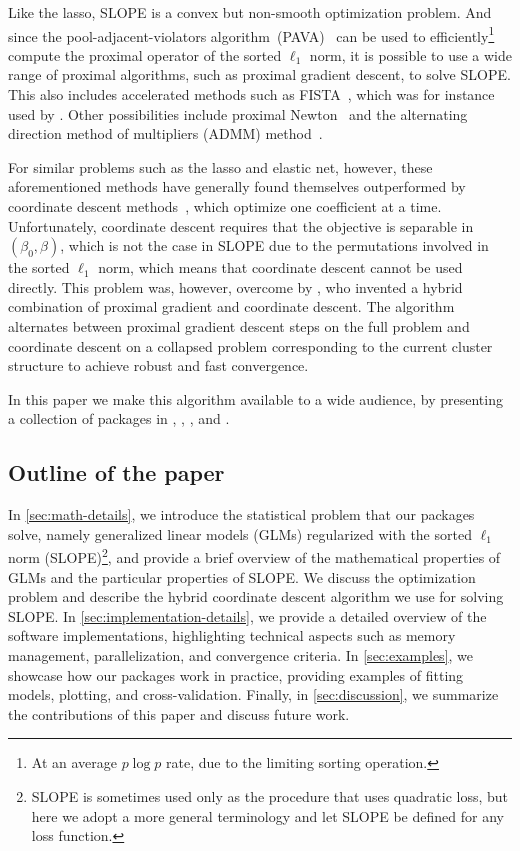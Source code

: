 \documentclass[article]{jss}
\begin{document}
Like the lasso, SLOPE is a convex but non-smooth optimization problem. And since the
pool-adjacent-violators algorithm~(PAVA)~\citep{barlow1972} can be used to
efficiently\footnote{At an average \(p \log p\) rate, due to the limiting
  sorting operation.} compute the proximal operator of the sorted \(\ell_1\)
norm, it is possible to use a wide range of proximal algorithms, such
as proximal gradient descent, to solve SLOPE. This also includes accelerated
methods such as FISTA~\citep{beck2009}, which was for instance used by
\citet{bogdan2015}. Other possibilities include proximal Newton~\citep{lee2014}
and the alternating direction method of multipliers (ADMM) method~\citep{boyd2010}.

For similar problems such as the lasso and
elastic net\citep{zou2005}, however, these
aforementioned methods have generally found themselves outperformed by coordinate
descent methods~\citep{friedman2007,friedman2010}, which optimize one
coefficient at a time. Unfortunately, coordinate descent requires that the
objective is separable in \((\beta_0, \beta)\), which is not the case in SLOPE
due to the permutations involved in the sorted \(\ell_1\) norm, which means
that coordinate descent cannot be used directly. This problem was, however,
overcome by \citet{larsson2023}, who invented a hybrid combination of proximal
gradient and coordinate descent. The algorithm alternates between proximal gradient
descent steps on the full problem and coordinate descent on a collapsed
problem corresponding to the current cluster structure to achieve
robust and fast convergence.

In this paper we make this algorithm available to a wide audience, by
presenting a collection of packages in , ,
, and .

\subsection{Outline of the paper}

In \autoref{sec:math-details}, we introduce the statistical problem that our
packages solve, namely generalized linear models (GLMs) regularized with the sorted
\(\ell_1\) norm (SLOPE)\footnote{SLOPE is sometimes used only as the procedure
  that uses quadratic loss, but here we adopt a more general terminology and
  let SLOPE be defined for any loss function.}, and provide a brief overview of
the mathematical properties of GLMs and the particular properties of SLOPE.
We discuss the optimization problem and describe the hybrid
coordinate descent algorithm we use for solving SLOPE.
In \autoref{sec:implementation-details}, we provide a detailed overview of the
software implementations, highlighting technical aspects such as
memory management, parallelization, and convergence criteria.
In \autoref{sec:examples}, we showcase how our packages work in practice,
providing examples of fitting models, plotting, and cross-validation.
Finally, in \autoref{sec:discussion}, we summarize the contributions of this paper
and discuss future work.
\end{document}
